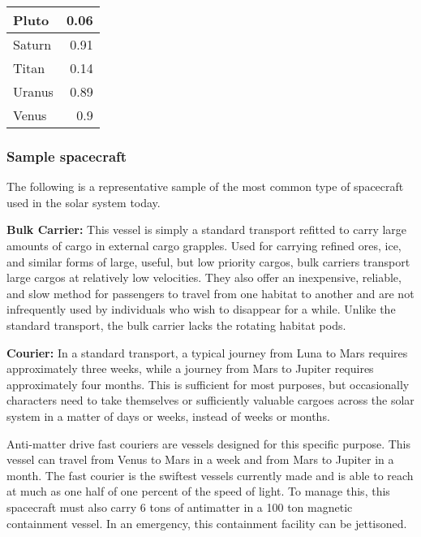 {{\begin{table}
\begin{tabular}{|l|r}
Pluto	&0.06 \\ \hline

Saturn	&0.91 \\ \hline

Titan	&0.14 \\ \hline

Uranus	&0.89 \\ \hline

Venus	&0.9 \\ \hline

\end{tabular} \label{tab:excaping-gravity} \end{table} 

\subsubsection{Sample spacecraft} 

The following is a representative sample of the most common type of spacecraft used in the solar system today. 

\textbf{Bulk Carrier:} This vessel is simply a standard transport refitted to carry large amounts of cargo in external cargo grapples. Used for carrying refined ores, ice, and similar forms of large, useful, but low priority cargos, bulk carriers transport large cargos at relatively low velocities. They also offer an inexpensive, reliable, and slow method for passengers to travel from one habitat to another and are not infrequently used by individuals who wish to disappear for a while. Unlike the standard transport, the bulk carrier lacks the rotating habitat pods. 

\textbf{Courier:} In a standard transport, a typical journey from Luna to Mars requires approximately three weeks, while a journey from Mars to Jupiter requires approximately four months. This is sufficient for most purposes, but occasionally characters need to take themselves or sufficiently valuable cargoes across the solar system in a matter of days or weeks, instead of weeks or months. 

Anti-matter drive fast couriers are vessels designed for this specific purpose. This vessel can travel from Venus to Mars in a week and from Mars to Jupiter in a month. The fast courier is the swiftest vessels currently made and is able to reach at much as one half of one percent of the speed of light. To manage this, this spacecraft must also carry 6 tons of antimatter in a 100 ton magnetic containment vessel. In an emergency, this containment facility can be jettisoned. 

}}
